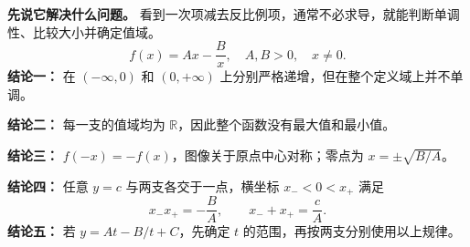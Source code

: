\begin{statementbox}
\textbf{先说它解决什么问题。} 看到一次项减去反比例项，通常不必求导，就能判断单调性、比较大小并确定值域。
\[
\boxed{f(x)=Ax-\frac Bx,\quad A,B>0,\quad x\ne0.}
\]
\textbf{结论一：} 在 $(-\infty,0)$ 和 $(0,+\infty)$ 上分别严格递增，但在整个定义域上并不单调。

\textbf{结论二：} 每一支的值域均为 $\mathbb R$，因此整个函数没有最大值和最小值。

\textbf{结论三：} $f(-x)=-f(x)$，图像关于原点中心对称；零点为 $x=\pm\sqrt{B/A}$。

\textbf{结论四：} 任意 $y=c$ 与两支各交于一点，横坐标 $x_-<0<x_+$ 满足
\[
\boxed{x_-x_+=-\frac BA,\qquad x_-+x_+=\frac cA.}
\]
\textbf{结论五：} 若 $y=At-B/t+C$，先确定 $t$ 的范围，再按两支分别使用以上规律。
\end{statementbox}
